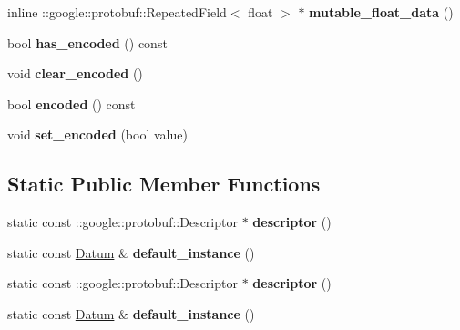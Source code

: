 \begin{DoxyCompactItemize}
inline \+::google\+::protobuf\+::\+Repeated\+Field$<$ float $>$ $\ast$ {\bfseries mutable\+\_\+float\+\_\+data} ()
\item 
\mbox{\label{classcaffe_1_1_datum_aef326ba35a582480897b95539c7501dd}} 
bool {\bfseries has\+\_\+encoded} () const
\item 
\mbox{\label{classcaffe_1_1_datum_aa27b32e16eb3b61009c75a20e0ac3a10}} 
void {\bfseries clear\+\_\+encoded} ()
\item 
\mbox{\label{classcaffe_1_1_datum_ac9f09584c5a1936f727bad5ceff2094e}} 
bool {\bfseries encoded} () const
\item 
\mbox{\label{classcaffe_1_1_datum_aa65cdd18b5868026063a85378e6613d5}} 
void {\bfseries set\+\_\+encoded} (bool value)
\end{DoxyCompactItemize}
\subsection*{Static Public Member Functions}
\begin{DoxyCompactItemize}
\item 
\mbox{\label{classcaffe_1_1_datum_a13253e3a74f09e99364e71a5201d950d}} 
static const \+::google\+::protobuf\+::\+Descriptor $\ast$ {\bfseries descriptor} ()
\item 
\mbox{\label{classcaffe_1_1_datum_ad5475f251359bc082833ab007c2c1963}} 
static const \mbox{\hyperlink{classcaffe_1_1_datum}{Datum}} \& {\bfseries default\+\_\+instance} ()
\item 
\mbox{\label{classcaffe_1_1_datum_a2ed0b6ea7d1195a8aa330796d9e10b44}} 
static const \+::google\+::protobuf\+::\+Descriptor $\ast$ {\bfseries descriptor} ()
\item 
\mbox{\label{classcaffe_1_1_datum_a99e91bbb04c2504f460ba4f99bb8f83f}} 
static const \mbox{\hyperlink{classcaffe_1_1_datum}{Datum}} \& {\bfseries default\+\_\+instance} ()
\end{DoxyCompactItemize}

